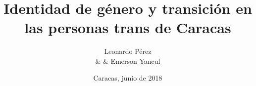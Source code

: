 \documentclass[12pt,letterpaper,twoside,openright]{memoir}
\author{Leonardo Pérez \\ & & Emerson Yancul}
\date{Caracas, junio de 2018}
\title{Identidad de género y transición en las personas trans de Caracas}
\begin{document}
    \maketitle
    \nocite{*}
    \frontmatter
    \tableofcontents
    \cleardoublepage
    \listoftables*
    \mainmatter
    
    
    \printbibliography
    \appendix
    \appendixpage
\end{document}
